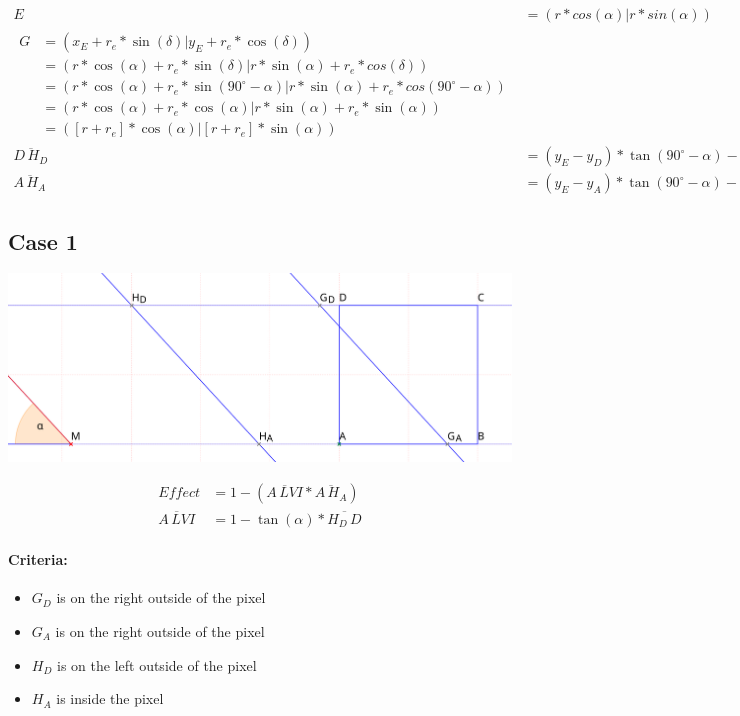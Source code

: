 \documentclass[a4paper,10pt,fleqn]{scrartcl}
\numberwithin{equation}{subsection}
\begin{document}
\begin{align}
E &= (r * cos(\alpha) | r * sin(\alpha)) \\
\begin{split}
G &= (x_E + r_e * \sin(\delta) | y_E + r_e * \cos(\delta)) \\
  &= (r * \cos(\alpha) + r_e * \sin(\delta) | r * \sin(\alpha) + r_e * cos(\delta))\\
  &= (r * \cos(\alpha) + r_e * \sin(90^\circ - \alpha) | r * \sin(\alpha) + r_e * cos(90^\circ - \alpha))\\
  &= (r * \cos(\alpha) + r_e * \cos(\alpha) | r * \sin(\alpha) + r_e * \sin(\alpha))\\
  &= ([r + r_e] * \cos(\alpha) | [r + r_e] * \sin(\alpha))
\end{split}\\
\overline{D\,H_D} &= (y_E - y_D) * \tan(90^\circ-\alpha) - x_D \\
\overline{A\,H_A} &= (y_E - y_A) * \tan(90^\circ-\alpha) - x_A
\end{align}
\newpage
%
\subsection{Case 1}
\begin{minipage}{\textwidth}
\includegraphics[width=\textwidth]{case1}
\end{minipage}
\begin{align}
Effect &= 1 - (\overline{A\,LVI} * \overline{A\,H_A})\\
\overline{A\,LVI} &=  1 - \tan(\alpha) * \overline{H_D\,D}
\end{align}
\paragraph{Criteria:}
\begin{itemize}
 \item $G_D$ is on the right outside of the pixel
 \item $G_A$ is on the right outside of the pixel
 \item $H_D$ is on the left outside of the pixel
 \item $H_A$ is inside the pixel
\end{itemize}
%
\end{document}
